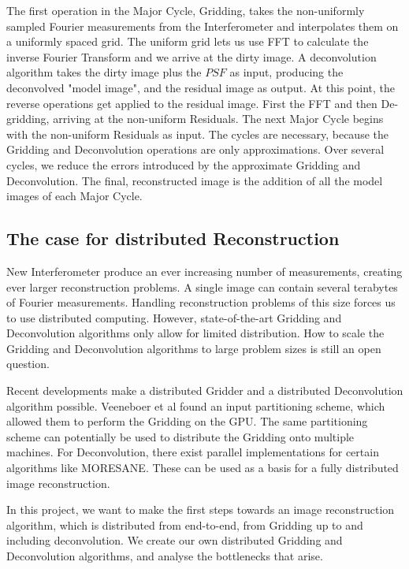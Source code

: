 \documentclass[11pt]{article}
\numberwithin{equation}{section}
\begin{document}
The first operation in the Major Cycle, Gridding, takes the non-uniformly sampled Fourier measurements from the Interferometer and interpolates them on a uniformly spaced grid. The uniform grid lets us use FFT to calculate the inverse Fourier Transform and we arrive at the dirty image. A deconvolution algorithm takes the dirty image plus the $PSF$ as input, producing the deconvolved "model image", and the residual image as output. At this point, the reverse operations get applied to the residual image. First the FFT and then De-gridding, arriving at the non-uniform Residuals. The next Major Cycle begins with the non-uniform Residuals as input. The cycles are necessary, because the Gridding and Deconvolution operations are only approximations. Over several cycles, we reduce the errors introduced by the approximate Gridding and Deconvolution. The final, reconstructed image is the addition of all the model images of each Major Cycle. 

\subsection*{The case for distributed Reconstruction}
New Interferometer produce an ever increasing number of measurements, creating ever larger reconstruction problems. A single image can contain several terabytes of Fourier measurements. Handling reconstruction problems of this size forces us to use distributed computing. However, state-of-the-art Gridding and Deconvolution algorithms only allow for limited distribution. How to scale the Gridding and Deconvolution algorithms to large problem sizes is still an open question.

Recent developments make a distributed Gridder and a distributed Deconvolution algorithm possible. Veeneboer et al\cite{veenboer2017image} found an input partitioning scheme, which allowed them to perform the Gridding on the GPU. The same partitioning scheme can potentially be used to distribute the Gridding onto multiple machines. For Deconvolution, there exist parallel implementations for certain algorithms like MORESANE\cite{dabbech2015moresane}. These can be used as a basis for a fully distributed image reconstruction.

In this project, we want to make the first steps towards an image reconstruction algorithm, which is distributed from end-to-end, from Gridding up to and including deconvolution. We create our own distributed Gridding and Deconvolution algorithms, and analyse the bottlenecks that arise.
\end{document}

